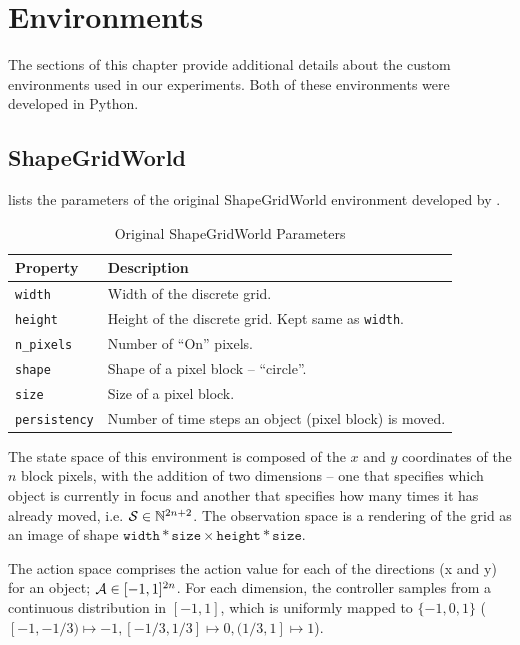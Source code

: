 \chapter{Environments}
The sections of this chapter provide additional details about the custom environments used in our experiments.
Both of these environments were developed in Python.

\section{ShapeGridWorld}
\label{sec:sgw-details}
 lists the parameters of the original ShapeGridWorld environment developed by \cite{rair}.
\begin{table}[H]
    \centering
    \begin{tabularx}{\textwidth}{C{4.2cm} L}
        \hline
        Property & Description\\
        \hline
        \texttt{width} & Width of the discrete grid.\\
        \texttt{height} & Height of the discrete grid. Kept same as \texttt{width}.\\
        \texttt{n\_pixels} & Number of ``On'' pixels.\\
        \texttt{shape} & Shape of a pixel block -- ``circle''.\\
        \texttt{size} & Size of a pixel block.\\
        \texttt{persistency} & Number of time steps an object (pixel block) is moved. \\
        \hline
    \end{tabularx}
    \caption{Original ShapeGridWorld Parameters}
    \label{tab:original-sgw-params}
\end{table}
The state space of this environment is composed of the \(x\) and \(y\) coordinates of the \(n\) block pixels, with the addition of two dimensions -- one that specifies which object is currently in focus and another that specifies how many times it has already moved, i.e. \(\mathcal{S} \in \mathbb{N}^{2 n + 2}\).
The observation space is a rendering of the grid as an image of shape \(\texttt{width} * \texttt{size} \times \texttt{height} * \texttt{size}\).

The action space comprises the action value for each of the directions (x and y) for an object; \(\mathcal{A} \in [-1, 1]^{2 n}\).
For each dimension, the controller samples from a continuous distribution in \([-1, 1]\), which is uniformly mapped to \(\{-1, 0, 1\}\) (\([-1, -1/3) \mapsto -1, [-1/3, 1/3] \mapsto 0, (1/3, 1] \mapsto 1\)).

